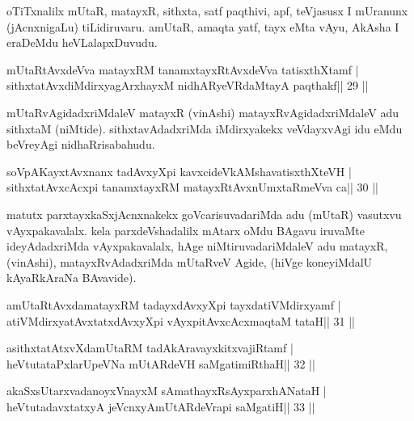 \begin{artha}
oTiTxnalilx mUtaR, matayxR, sithxta, satf paqthivi, apf, teVjasusx I mUranunx (jAcnxnigaLu) tiLidiruvaru. amUtaR, amaqta yatf, tayx eMta vAyu, AkAsha I eraDeMdu heVLalapxDuvudu.
\end{artha}



\begin{shl}
mUtaRtAvxdeVva matayxRM tanamxtayxRtAvxdeVva tatisxthXtamf |
sithxtatAvxdiMdirxyagArxhayxM nidhARyeVRdaMtayA paqthakf\hfill || 29 ||
\end{shl}

\begin{artha}
mUtaRvAgidadxriMdaleV matayxR (vinAshi) matayxRvAgidadxriMdaleV adu sithxtaM (niMtide). sithxtavAdadxriMda iMdirxyakekx veVdayxvAgi idu eMdu beVreyAgi nidhaRrisabahudu.
\end{artha}



\begin{shl}
soVpAKayxtAvxnanx tadAvxyXpi kavxcideVkAMshavatisxthXteVH |
sithxtatAvxcAcxpi tanamxtayxRM matayxRtAvxnUmxtaRmeVva ca\hfill || 30 ||
\end{shl}

\begin{artha}
matutx parxtayxkaSxjAcnxnakekx goVcarisuvadariMda adu (mUtaR) vasutxvu vAyxpakavalalx. kela parxdeVshadalilx mAtarx oMdu BAgavu iruvaMte  ideyAdadxriMda vAyxpakavalalx, hAge niMtiruvadariMdaleV adu matayxR, (vinAshi), matayxRvAdadxriMda mUtaRveV Agide, (hiVge koneyiMdalU kAyaRkAraNa BAvavide).
\end{artha}



\begin{shl}
amUtaRtAvxdamatayxRM tadayxdAvxyXpi tayxdatiVMdirxyamf |
atiVMdirxyatAvxtatxdAvxyXpi vAyxpitAvxcAcxmaqtaM tataH\hfill || 31 ||
\end{shl}

\begin{shl}
asithxtatAtxvXdamUtaRM tadAkAravayxkitxvajiRtamf |
heVtutataPxlarUpeVNa mUtARdeVH saMgatimiRthaH\hfill || 32 ||
\end{shl}

\begin{shl}
akaSxsUtarxvadanoyxVnayxM sAmathayxRsAyxparxhANataH |
heVtutadavxtatxyA jeVcnxyA\s mUtARdeVrapi saMgatiH\hfill || 33 ||
\end{shl}

